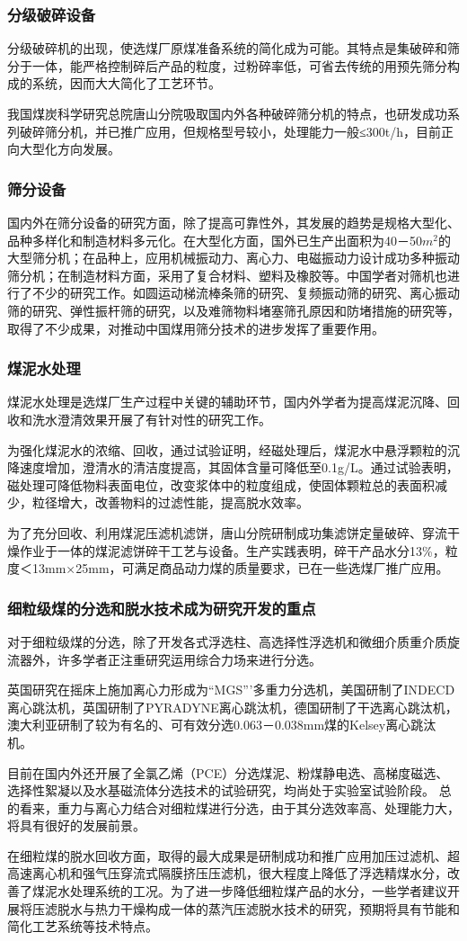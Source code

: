 \documentclass[10pt,openany]{ctexbook}
\begin{document}
    \subsubsection{分级破碎设备}
分级破碎机的出现，使选煤厂原煤准备系统的简化成为可能。其特点是集破碎和筛分于一体，能严格控制碎后产品的粒度，过粉碎率低，可省去传统的用预先筛分构成的系统，因而大大简化了工艺环节。\par
    我国煤炭科学研究总院唐山分院吸取国内外各种破碎筛分机的特点，也研发成功系列破碎筛分机，并已推广应用，但规格型号较小，处理能力一般≤300t/h，目前正向大型化方向发展。
\subsubsection{筛分设备}
国内外在筛分设备的研究方面，除了提高可靠性外，其发展的趋势是规格大型化、品种多样化和制造材料多元化。在大型化方面，国外已生产出面积为40－50$m^2$的大型筛分机；在品种上，应用机械振动力、离心力、电磁振动力设计成功多种振动筛分机；在制造材料方面，采用了复合材料、塑料及橡胶等。中国学者对筛机也进行了不少的研究工作。如圆运动梯流棒条筛的研究、复频振动筛的研究、离心振动筛的研究、弹性振杆筛的研究，以及难筛物料堵塞筛孔原因和防堵措施的研究等，取得了不少成果，对推动中国煤用筛分技术的进步发挥了重要作用。
\subsubsection{煤泥水处理}
煤泥水处理是选煤厂生产过程中关键的辅助环节，国内外学者为提高煤泥沉降、回收和洗水澄清效果开展了有针对性的研究工作。 \par
    为强化煤泥水的浓缩、回收，通过试验证明，经磁处理后，煤泥水中悬浮颗粒的沉降速度增加，澄清水的清洁度提高，其固体含量可降低至0.1g/L。通过试验表明，磁处理可降低物料表面电位，改变浆体中的粒度组成，使固体颗粒总的表面积减少，粒径增大，改善物料的过滤性能，提高脱水效率。\par
    为了充分回收、利用煤泥压滤机滤饼，唐山分院研制成功集滤饼定量破碎、穿流干燥作业于一体的煤泥滤饼碎干工艺与设备。生产实践表明，碎干产品水分13\%，粒度＜13mm×25mm，可满足商品动力煤的质量要求，已在一些选煤厂推广应用。
\subsubsection{细粒级煤的分选和脱水技术成为研究开发的重点}
对于细粒级煤的分选，除了开发各式浮选柱、高选择性浮选机和微细介质重介质旋流器外，许多学者正注重研究运用综合力场来进行分选。\par
    英国研究在摇床上施加离心力形成为“MGS”’多重力分选机，美国研制了INDECD离心跳汰机，英国研制了PYRADYNE离心跳汰机，德国研制了干选离心跳汰机，澳大利亚研制了较为有名的、可有效分选0.063－0.038mm煤的Kelsey离心跳汰机。\par
    目前在国内外还开展了全氯乙烯（PCE）分选煤泥、粉煤静电选、高梯度磁选、选择性絮凝以及水基磁流体分选技术的试验研究，均尚处于实验室试验阶段。
总的看来，重力与离心力结合对细粒煤进行分选，由于其分选效率高、处理能力大，将具有很好的发展前景。  \par
    在细粒煤的脱水回收方面，取得的最大成果是研制成功和推广应用加压过滤机、超高速离心机和强气压穿流式隔膜挤压压滤机，很大程度上降低了浮选精煤水分，改善了煤泥水处理系统的工况。为了进一步降低细粒煤产品的水分，一些学者建议开展将压滤脱水与热力干燥构成一体的蒸汽压滤脱水技术的研究，预期将具有节能和简化工艺系统等技术特点。
\end{document}
